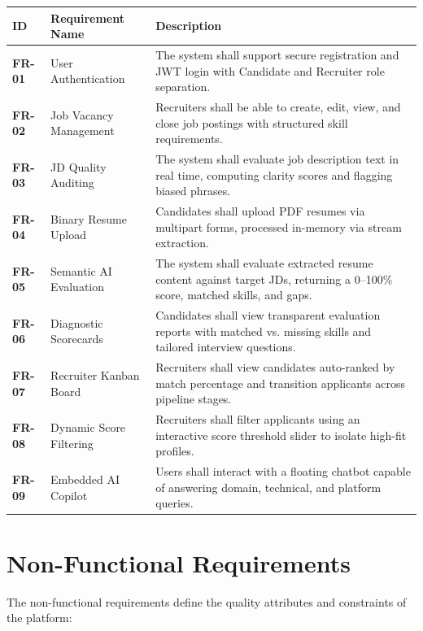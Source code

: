 \documentclass[12pt, a4paper]{article}
\begin{document}
\vspace{0.2cm}
\begin{center}
\renewcommand{\arraystretch}{1.2}
\begin{tabularx}{\textwidth}{l p{4.2cm} X}
\toprule
\textbf{\color{primary}ID} & \textbf{\color{primary}Requirement Name} & \textbf{\color{primary}Description} \\
\midrule
\textbf{FR-01} & User Authentication & The system shall support secure registration and JWT login with Candidate and Recruiter role separation. \\
\textbf{FR-02} & Job Vacancy Management & Recruiters shall be able to create, edit, view, and close job postings with structured skill requirements. \\
\textbf{FR-03} & JD Quality Auditing & The system shall evaluate job description text in real time, computing clarity scores and flagging biased phrases. \\
\textbf{FR-04} & Binary Resume Upload & Candidates shall upload PDF resumes via multipart forms, processed in-memory via stream extraction. \\
\textbf{FR-05} & Semantic AI Evaluation & The system shall evaluate extracted resume content against target JDs, returning a 0--100\% score, matched skills, and gaps. \\
\textbf{FR-06} & Diagnostic Scorecards & Candidates shall view transparent evaluation reports with matched vs. missing skills and tailored interview questions. \\
\textbf{FR-07} & Recruiter Kanban Board & Recruiters shall view candidates auto-ranked by match percentage and transition applicants across pipeline stages. \\
\textbf{FR-08} & Dynamic Score Filtering & Recruiters shall filter applicants using an interactive score threshold slider to isolate high-fit profiles. \\
\textbf{FR-09} & Embedded AI Copilot & Users shall interact with a floating chatbot capable of answering domain, technical, and platform queries. \\
\bottomrule
\end{tabularx}
\end{center}

\newpage

\section{Non-Functional Requirements}
The non-functional requirements define the quality attributes and constraints of the platform:
\end{document}
